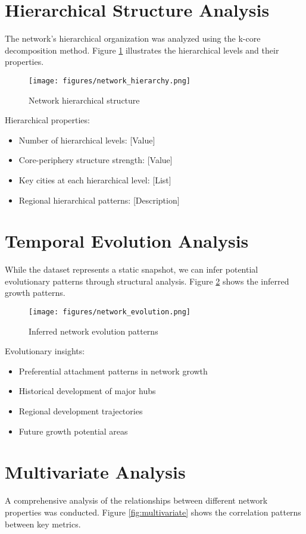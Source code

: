 \section{Hierarchical Structure Analysis}
The network's hierarchical organization was analyzed using the k-core decomposition method. Figure \ref{fig:hierarchy} illustrates the hierarchical levels and their properties.

\begin{figure}[H]
    \centering
    \texttt{[image: figures/network\_hierarchy.png]}
    \caption{Network hierarchical structure}
    \label{fig:hierarchy}
\end{figure}

Hierarchical properties:
\begin{itemize}
    \item Number of hierarchical levels: [Value]
    \item Core-periphery structure strength: [Value]
    \item Key cities at each hierarchical level: [List]
    \item Regional hierarchical patterns: [Description]
\end{itemize}

\section{Temporal Evolution Analysis}
While the dataset represents a static snapshot, we can infer potential evolutionary patterns through structural analysis. Figure \ref{fig:evolution} shows the inferred growth patterns.

\begin{figure}[H]
    \centering
    \texttt{[image: figures/network\_evolution.png]}
    \caption{Inferred network evolution patterns}
    \label{fig:evolution}
\end{figure}

Evolutionary insights:
\begin{itemize}
    \item Preferential attachment patterns in network growth
    \item Historical development of major hubs
    \item Regional development trajectories
    \item Future growth potential areas
\end{itemize}

\section{Multivariate Analysis}
A comprehensive analysis of the relationships between different network properties was conducted. Figure \ref{fig:multivariate} shows the correlation patterns between key metrics.

